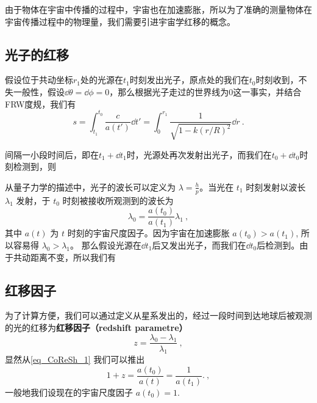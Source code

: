 \begin{issues}
\issueMissDepend
\end{issues}

由于物体在宇宙中传播的过程中，宇宙也在加速膨胀，所以为了准确的测量物体在宇宙传播过程中的物理量，我们需要引进宇宙学红移的概念。

\subsection{光子的红移}
假设位于共动坐标$r_1$处的光源在$t_1$时刻发出光子，原点处的我们在$t_0$时刻收到，不失一般性，假设$\dd\theta=\dd\phi=0$，那么根据光子走过的世界线为$0$这一事实，并结合FRW度规，我们有
\begin{equation}
s=\int^{t_0}_{t_1}\frac{c}{a(t')}\dd t'=\int_0^{r_1}\frac{1}{\sqrt{1-k(r/R)^2}}\dd r~.
\end{equation}

间隔一小段时间后，即在$t_1+\dd t_1$时，光源处再次发射出光子，而我们在$t_0+\dd t_0$时刻检测到，则



从量子力学的描述中，光子的波长可以定义为 $\lambda=\frac{h}{p}$。当光在 $t_1$ 时刻发射以波长 $\lambda_1$ 发射，于 $t_0$ 时刻被接收所观测到的波长为
\begin{equation}\label{eq_CoReSh_1}
\lambda_0=\frac{a(t_0)}{a(t_1)}\lambda_1~,
\end{equation}
其中 $a(t)$ 为 $t$ 时刻的宇宙尺度因子。因为宇宙在加速膨胀 $a(t_0)>a(t_1)$, 所以容易得 $\lambda_0>\lambda_1$。
那么假设光源在$\dd t_1$后又发出光子，而我们在$\dd t_0$后检测到。由于共动距离不变，所以我们有
\subsection{红移因子}
为了计算方便，我们可以通过定义从星系发出的，经过一段时间到达地球后被观测的光的红移为\textbf{红移因子（redshift parametre）}
\begin{equation}
z=\frac{\lambda_0-\lambda_1}{\lambda_1}~,
\end{equation}
显然从\autoref{eq_CoReSh_1} 我们可以推出
\begin{equation}
1+z=\frac{a(t_0)}{a(t)}=\frac{1}{a(t_1)}. \label{eq_CoReSh_2}~,
\end{equation}
一般地我们设现在的宇宙尺度因子 $a(t_0)=1$.

